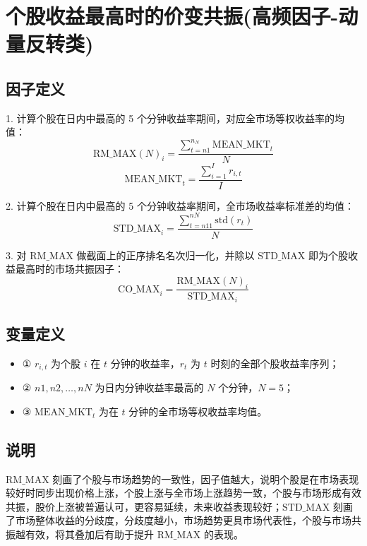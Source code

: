 \documentclass{article}
\begin{document}
\section{个股收益最高时的价变共振(高频因子-动量反转类)}

\subsection{因子定义}

1. 计算个股在日内中最高的 5 个分钟收益率期间，对应全市场等权收益率的均值：
\begin{equation}
    \mathrm{RM\_MAX}(N)_i = \frac{\sum_{t=n1}^{n_N} \mathrm{MEAN\_MKT}_t}{N}
\end{equation}
\begin{equation}
    \mathrm{MEAN\_MKT}_t = \frac{\sum_{i=1}^I r_{i,t}}{I}
\end{equation}

2. 计算个股在日内中最高的 5 个分钟收益率期间，全市场收益率标准差的均值：
\begin{equation}
    \mathrm{STD\_MAX}_i = \frac{\sum_{t=n11}^{nN} \mathrm{std}(r_t)}{N}
\end{equation}

3. 对 \( \mathrm{RM\_MAX} \) 做截面上的正序排名名次归一化，并除以 \( \mathrm{STD\_MAX} \) 即为个股收益最高时的市场共振因子：
\begin{equation}
    \mathrm{CO\_MAX}_i = \frac{\mathrm{RM\_MAX}(N)_i}{\mathrm{STD\_MAX}_i}
\end{equation}

\subsection{变量定义}
\begin{itemize}
    \item ① \( r_{i,t} \) 为个股 \( i \) 在 \( t \) 分钟的收益率，\( r_t \) 为 \( t \) 时刻的全部个股收益率序列；
    \item ② \( n1, n2, \ldots, nN \) 为日内分钟收益率最高的 \( N \) 个分钟，\( N=5 \)；
    \item ③ \( \mathrm{MEAN\_MKT}_t \) 为在 \( t \) 分钟的全市场等权收益率均值。
\end{itemize}

\subsection{说明}
\( \mathrm{RM\_MAX} \) 刻画了个股与市场趋势的一致性，因子值越大，说明个股是在市场表现较好时同步出现价格上涨，个股上涨与全市场上涨趋势一致，个股与市场形成有效共振，股价上涨被普遍认可，更容易延续，未来收益表现较好；\( \mathrm{STD\_MAX} \) 刻画了市场整体收益的分歧度，分歧度越小，市场趋势更具市场代表性，个股与市场共振越有效，将其叠加后有助于提升 \( \mathrm{RM\_MAX} \) 的表现。
\end{document}
